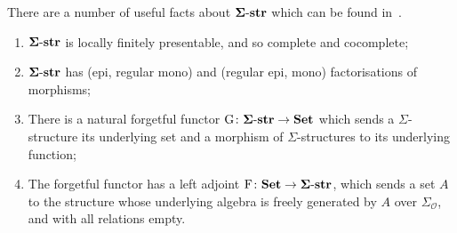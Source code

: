 \documentclass[11pt, a4paper, twoside,leqno]{amsart}
\newcommand{\cat}[1]{\mathbf{#1}}
\renewcommand{\O}{{\mathcal O}}
\numberwithin{equation}{section}
\theoremstyle{plain}
\theoremstyle{definition}
\newcommand{\Set}{\cat{Set}}
\newcommand{\Sig}{\mathbf \Sigma\text-\cat{str}}
\begin{document}
There are a number of useful facts about \(\Sig\) which can be found
in~\cite{Adamek:1994aa}. 
\begin{enumerate}[label=(\alph*), ref=(\alph*)]
\item
  \label{it:sig-lfp}
  \(\Sig\) is locally finitely presentable, and so complete and
  cocomplete;
\item
  \label{it:sig-factor-sys}
  \(\Sig\) has (epi, regular mono) and (regular epi, mono)
  factorisations of morphisms;
\item
  \label{it:sig-forgetful}
  There is a natural forgetful functor
  \(\mathrm{G}
  \colon \Sig \rightarrow \Set\) which sends a \(\Sigma\)-structure
  its underlying set and a morphism of \(\Sigma\)-structures to its
  underlying function;
\item
  \label{it:sig-free}
  The forgetful functor has a
  left adjoint \(\mathrm{F}
  \colon \Set \rightarrow \Sig\), which sends a set \(A\) to the
  structure whose underlying algebra is freely generated by \(A\) over
  \(\Sigma_{\O}\), and with all relations empty.

\end{enumerate}
\end{document}
